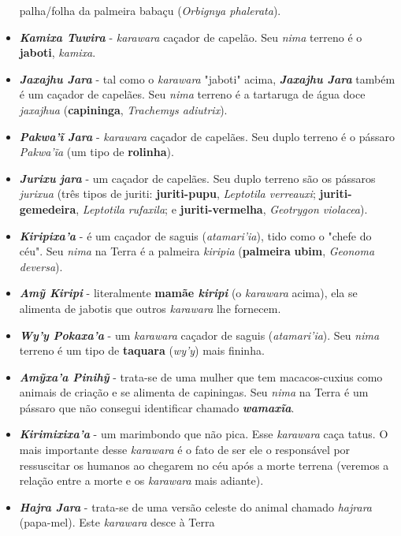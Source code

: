\begin{itemize}
  palha/folha da palmeira babaçu (\emph{Orbignya phalerata}).
\item
  \textbf{\emph{Kamixa Tuwira}} - \emph{karawara} caçador de capelão.
  Seu \emph{nima} terreno é o \textbf{jaboti}, \emph{kamixa}.
\item
  \emph{\textbf{Jaxajhu Jara}} - tal como o \emph{karawara} "jaboti"
  acima, \emph{\textbf{Jaxajhu Jara}} também é um caçador de capelães.
  Seu \emph{nima} terreno é a tartaruga de água doce \emph{jaxajhua}
  (\textbf{capininga}, \emph{Trachemys adiutrix}).
\item
  \textbf{\emph{Pakwa'ĩ} \emph{Jara}} - \emph{karawara} caçador de
  capelães. Seu duplo terreno é o pássaro \emph{Pakwa'ĩa} (um tipo de
  \textbf{rolinha}).
\item
  \textbf{\emph{Jurixu} \emph{jara}} - um caçador de capelães. Seu duplo
  terreno são os pássaros \emph{jurixua} (três tipos de juriti:
  \textbf{juriti-pupu}, \emph{Leptotila verreauxi};
  \textbf{juriti-gemedeira}, \emph{Leptotila} \emph{rufaxila}; e
  \textbf{juriti-vermelha}, \emph{Geotrygon violacea}).
\item
  \emph{\textbf{Kiripixa'a}} - é um caçador de saguis
  (\emph{atamari'ia}), tido como o "chefe do céu". Seu \emph{nima} na
  Terra é a palmeira \emph{kiripia} (\textbf{palmeira} \textbf{ubim},
  \emph{Geonoma deversa}).
\item
  \emph{\textbf{Amỹ Kiripi}} - literalmente \textbf{mamãe \emph{kiripi}}
  (o \emph{karawara} acima), ela se alimenta de jabotis que outros
  \emph{karawara} lhe fornecem.
\item
  \emph{\textbf{Wy'y Pokaxa'a}} - um \emph{karawara} caçador de saguis
  (\emph{atamari'ia}). Seu \emph{nima} terreno é um tipo de
  \textbf{taquara} (\emph{wy'y}) mais fininha.
\item
  \emph{\textbf{Amỹxa'a Pinihỹ}} - trata-se de uma mulher que tem
  macacos-cuxius como animais de criação e se alimenta de capiningas.
  Seu \emph{nima} na Terra é um pássaro que não consegui identificar
  chamado \emph{\textbf{wamaxĩa}}.
\item
  \emph{\textbf{Kirimixixa'a}} - um marimbondo que não pica. Esse
  \emph{karawara} caça tatus. O mais importante desse \emph{karawara} é
  o fato de ser ele o responsável por ressuscitar os humanos ao chegarem
  no céu após a morte terrena (veremos a relação entre a morte e os
  \emph{karawara} mais adiante).
\item
  \emph{\textbf{Hajra Jara}} - trata-se de uma versão celeste do animal
  chamado \emph{hajrara} (papa-mel). Este \emph{karawara} desce à Terra

\end{itemize}
